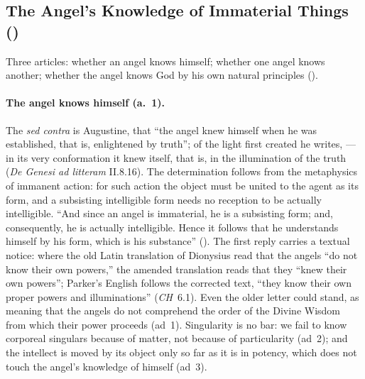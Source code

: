 \subsection{The Angel's Knowledge of Immaterial Things ()}\label{sec:q56}

Three articles: whether an angel knows himself; whether one angel knows
another; whether the angel knows God by his own natural principles
().

\paragraph{The angel knows himself (a.~1).} The \emph{sed contra} is
Augustine, that ``the angel knew himself when he was established, that is,
enlightened by truth''; of the light first created he writes,
 --- in its very conformation it knew itself, that is, in the
illumination of the truth (\emph{De Genesi ad litteram} II.8.16). The
determination follows from the metaphysics of immanent action: for such
action the object must be united to the agent as its form, and a
subsisting intelligible form needs no reception to be actually
intelligible. ``And since an angel is immaterial, he is a subsisting form;
and, consequently, he is actually intelligible. Hence it follows that he
understands himself by his form, which is his substance'' (). The first reply
carries a textual notice: where the old Latin translation of Dionysius
read that the angels ``do not know their own powers,'' the amended
translation reads that they ``knew their own powers''; Parker's English
follows the corrected text, ``they know their own proper powers and
illuminations'' (\emph{CH}~6.1). Even the older letter could stand, as
meaning that the angels do not comprehend the order of the Divine Wisdom
from which their power proceeds (ad~1). Singularity is no bar: we fail to
know corporeal singulars because of matter, not because of particularity
(ad~2); and the intellect is moved by its object only so far as it is in
potency, which does not touch the angel's knowledge of himself (ad~3).

